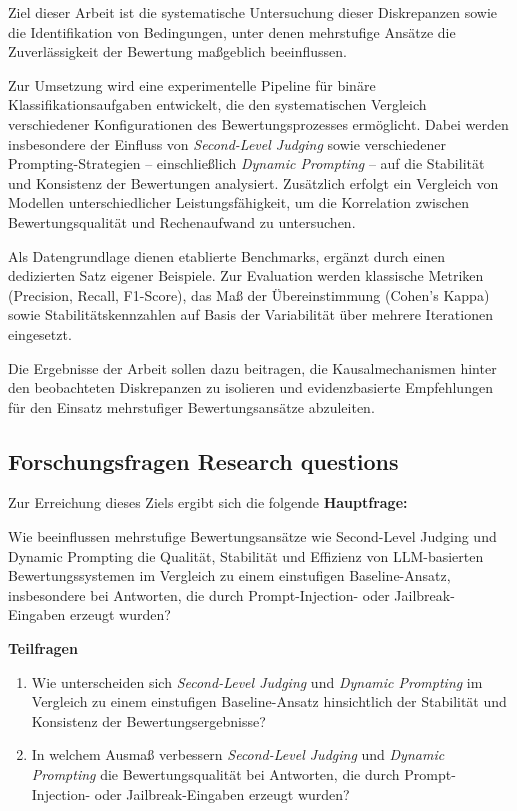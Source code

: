 \documentclass[ngerman]{rwureport}
\begin{document}
{{{{{Ziel dieser Arbeit ist die systematische Untersuchung dieser Diskrepanzen sowie die Identifikation von Bedingungen, unter denen mehrstufige Ansätze die Zuverlässigkeit der Bewertung maßgeblich beeinflussen.

Zur Umsetzung wird eine experimentelle Pipeline für binäre Klassifikationsaufgaben entwickelt, die den systematischen Vergleich verschiedener Konfigurationen des Bewertungsprozesses ermöglicht. Dabei werden insbesondere der Einfluss von \textit{Second-Level Judging} sowie verschiedener Prompting-Strategien – einschließlich \textit{Dynamic Prompting} – auf die Stabilität und Konsistenz der Bewertungen analysiert. Zusätzlich erfolgt ein Vergleich von Modellen unterschiedlicher Leistungsfähigkeit, um die Korrelation zwischen Bewertungsqualität und Rechenaufwand zu untersuchen.

Als Datengrundlage dienen etablierte Benchmarks, ergänzt durch einen dedizierten Satz eigener Beispiele. Zur Evaluation werden klassische Metriken (Precision, Recall, F1-Score), das Maß der Übereinstimmung (Cohen’s Kappa) sowie Stabilitätskennzahlen auf Basis der Variabilität über mehrere Iterationen eingesetzt.

Die Ergebnisse der Arbeit sollen dazu beitragen, die Kausalmechanismen hinter den beobachteten Diskrepanzen zu isolieren und evidenzbasierte Empfehlungen für den Einsatz mehrstufiger Bewertungsansätze abzuleiten.
}



\subsection{
    {Forschungsfragen}
    {Research questions}}
\label{sub:questions}


{	Zur Erreichung dieses Ziels ergibt sich die folgende
		\textbf{Hauptfrage:}
	
	Wie beeinflussen mehrstufige Bewertungsansätze wie Second-Level Judging und Dynamic Prompting die Qualität, Stabilität und Effizienz von LLM-basierten Bewertungssystemen im Vergleich zu einem einstufigen Baseline-Ansatz, insbesondere bei Antworten, die durch Prompt-Injection- oder Jailbreak-Eingaben erzeugt wurden?
	
	\vspace{0.5em}
	
	\textbf{Teilfragen}
	
	\begin{enumerate}
		\item Wie unterscheiden sich \textit{Second-Level Judging} und \textit{Dynamic Prompting} im Vergleich zu einem einstufigen Baseline-Ansatz hinsichtlich der Stabilität und Konsistenz der Bewertungsergebnisse?
		\item In welchem Ausmaß verbessern \textit{Second-Level Judging} und \textit{Dynamic Prompting} die Bewertungsqualität bei Antworten, die durch Prompt-Injection- oder Jailbreak-Eingaben erzeugt wurden?
		

\end{enumerate}}}}}}
\end{document}
